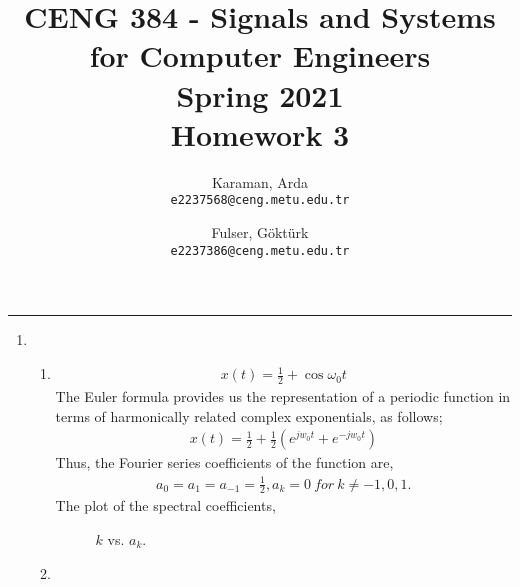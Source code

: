 \documentclass[10pt,a4paper, margin=1in]{article}
\author{
  Karaman, Arda\\
  \texttt{e2237568@ceng.metu.edu.tr}
  \and
  Fulser, Göktürk\\
  \texttt{e2237386@ceng.metu.edu.tr}
}
\title{CENG 384 - Signals and Systems for Computer Engineers \\
Spring 2021 \\
Homework 3}
\begin{document}
\maketitle



\noindent\rule{19cm}{1.2pt}

\begin{enumerate}

\item %
    \begin{enumerate}
    \item %
     \begin{align*}
        x(t) = \frac{1}{2} + \cos{\omega_0t}
    \end{align*}
    The Euler formula provides us the representation of a periodic function in terms of harmonically related complex exponentials, as follows;
    \begin{align*}
        x(t) = \frac{1}{2} + \frac{1}{2}(e^{jw_0t} + e^{-jw_0t})
    \end{align*}
    Thus, the Fourier series coefficients of the function are,
    \begin{align*}
        a_0 = a_1 = a_{-1} = \frac{1}{2}, a_k = 0 \ for \ k\neq -1,0,1.
    \end{align*}
    The plot of the spectral coefficients,
    \begin{figure} [h!]
        \centering
        \caption{$k$ vs. $a_k$.}
        \label{fig:q2}
    \end{figure}
    \item %
    \begin{align*}

\end{align*}
\end{enumerate}
\end{enumerate}
\end{document}
